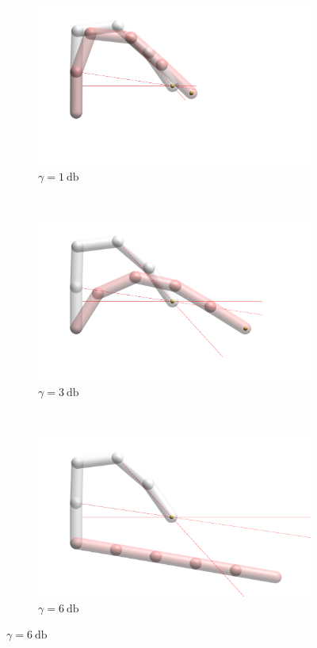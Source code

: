 \begin{figure}[h]
    \begin{subfigure}[b]{.3\textwidth}
        \includegraphics[width=\textwidth]{Figures/distortions/distortions1.png}
        \caption{$\gamma = \SI{1}{\decibel}$}
    \end{subfigure}
    ~
    \begin{subfigure}[b]{.3\textwidth}
        \includegraphics[width=\textwidth]{Figures/distortions/distortions3.png}
        \caption{$\gamma = \SI{3}{\decibel}$}
    \end{subfigure}
    ~
    \begin{subfigure}[b]{.3\textwidth}
        \includegraphics[width=\textwidth]{Figures/distortions/distortions6.png}
        \caption{$\gamma = \SI{6}{\decibel}$}
    \end{subfigure}


\end{figure}
